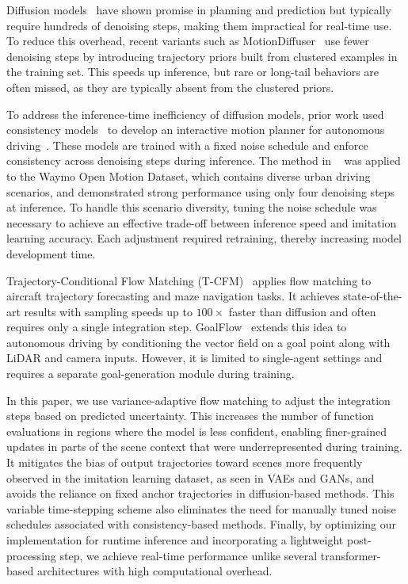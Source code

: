 \documentclass[conference]{IEEEtran}
\begin{document}

Diffusion models~\cite{diffusion_tri} have shown promise in planning and prediction but typically require hundreds of denoising steps, making them impractical for real-time use. To reduce this overhead, recent variants such as MotionDiffuser~\cite{motion_diffuser} use fewer denoising steps by introducing trajectory priors built from clustered examples in the training set.
This speeds up inference, but rare or long-tail behaviors are often missed, as they are typically absent from the clustered priors.

To address the inference-time inefficiency of diffusion models, prior work used consistency models~\cite{consistency_models} to develop an interactive motion planner for autonomous driving~\cite{consistency_model_hri}. These models are trained with a fixed noise schedule and enforce consistency across denoising steps during inference. The method in ~\cite{consistency_model_hri} was applied to the Waymo Open Motion Dataset, which contains diverse urban driving scenarios, and demonstrated strong performance using only four denoising steps at inference. To handle this scenario diversity, tuning the noise schedule was necessary to achieve an effective trade-off between inference speed and imitation learning accuracy. Each adjustment required retraining, thereby increasing model development time.


Trajectory-Conditional Flow Matching (T-CFM)~\cite{cfm_planninng_and_prediction} applies flow matching to aircraft trajectory forecasting and maze navigation tasks. It achieves state-of-the-art results with sampling speeds up to $100{\times}$ faster than diffusion and often requires only a single integration step. GoalFlow~\cite{goalflow} extends this idea to autonomous driving by conditioning the vector field on a goal point along with LiDAR and camera inputs. However, it is limited to single-agent settings and requires a separate goal-generation module during training.

In this paper, we use variance-adaptive flow matching to adjust the integration steps based on predicted uncertainty. This increases the number of function evaluations in regions where the model is less confident, enabling finer-grained updates in parts of the scene context that were underrepresented during training. It mitigates the bias of output trajectories toward scenes more frequently observed in the imitation learning dataset, as seen in VAEs and GANs, and avoids the reliance on fixed anchor trajectories in diffusion-based methods. This variable time-stepping scheme also eliminates the need for manually tuned noise schedules associated with consistency-based methods. Finally, by optimizing our implementation for runtime inference and incorporating a lightweight post-processing step, we achieve real-time performance unlike several transformer-based architectures with high computational overhead.
\end{document}
